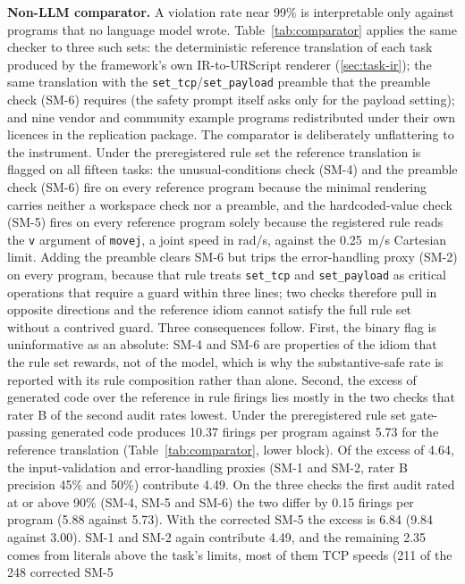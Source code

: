 \documentclass{ieeeaccess}
\begin{document}
\textbf{Non-LLM comparator.} A violation rate near 99\% is interpretable only against
programs that no language model wrote. Table~\ref{tab:comparator} applies the same checker
to three such sets: the deterministic reference translation of each task produced by the
framework's own IR-to-URScript renderer (\ref{sec:task-ir}); the same translation with the
\texttt{set\_tcp}/\texttt{set\_payload} preamble that the preamble check (SM-6) requires
(the safety prompt itself asks only for the payload setting); and nine vendor and community example programs redistributed under their own licences
in the replication package. The comparator is deliberately unflattering to the
instrument. Under the preregistered rule set the reference translation is flagged on all
fifteen tasks: the unusual-conditions check (SM-4) and the preamble check (SM-6) fire on
every reference program because the minimal rendering carries neither a workspace check
nor a preamble, and the hardcoded-value check (SM-5) fires on every reference program
solely because the registered rule reads the \texttt{v} argument of \texttt{movej}, a
joint speed in rad/s, against the 0.25~m/s Cartesian limit. Adding the preamble clears
SM-6 but trips the error-handling proxy (SM-2) on every program, because that rule treats
\texttt{set\_tcp} and \texttt{set\_payload} as critical operations that require a guard
within three lines; two checks therefore pull in opposite directions and the reference
idiom cannot satisfy the full rule set without a contrived guard. Three consequences
follow. First, the binary flag is uninformative as an absolute: SM-4 and SM-6 are
properties of the idiom that the rule set rewards, not of the model, which is why the
substantive-safe rate is reported with its rule composition rather than alone. Second, the
excess of generated code over the reference in rule firings lies mostly in the two checks
that rater B of the second audit rates lowest. Under the preregistered rule set gate-passing
generated code produces 10.37 firings per program against 5.73 for the reference translation
(Table~\ref{tab:comparator}, lower block). Of the excess of 4.64, the input-validation and
error-handling proxies (SM-1 and SM-2, rater B precision 45\% and 50\%) contribute 4.49. On
the three checks the first audit rated at or above 90\% (SM-4, SM-5 and SM-6) the two differ
by 0.15 firings per program (5.88 against 5.73). With the corrected SM-5 the excess is 6.84
(9.84 against 3.00). SM-1 and SM-2 again contribute 4.49, and the remaining 2.35 comes from
literals above the task's limits, most of them TCP speeds (211 of the 248 corrected SM-5
\end{document}
